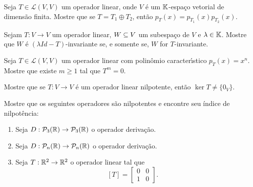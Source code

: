 \documentclass[12pt]{exam}
\begin{document}
\begin{exercicio}
Seja $T \in \mathcal{L}(V,V)$ um operador linear, onde $V$ \'e um $\mathbb{K}$-espa\c{c}o vetorial de dimens\~ao finita. Mostre que se $T = T_1 \oplus T_2$, ent\~ao $p_T(x) = p_{T_1}(x)p_{T_2}(x)$.
\end{exercicio}

\begin{exercicio}
  Sejam $T : V \to V$ um operador linear, $W \subseteq V$ um subespa\c{c}o de $V$ e $\lambda \in \mathbb{K}$. Mostre que $W$ \'e $(\lambda Id - T)$-invariante se, e somente se, $W$ for $T$-invariante.
\end{exercicio}

\begin{exercicio}
  Seja $T \in \mathcal{L}(V,V)$ um operador linear com polin\^omio caracter{\'\i}stico $p_T(x) = x^n$. Mostre que existe $m \ge 1$ tal que $T^m = 0$.
\end{exercicio}


\begin{exercicio}
  Mostre que se $T : V \to V$ \'e um operador linear nilpotente, ent\~ao $\ker T \ne \{0_V\}$.
\end{exercicio}

\begin{exercicio}
  Mostre que os seguintes operadores s\~ao nilpotentes e encontre seu \'indice de nilpot\^encia:
  \begin{enumerate}[label=({\alph*})]
    \item Seja $D : \mathcal{P}_3(\mathbb{R}) \to \mathcal{P}_3(\mathbb{R})$ o operador deriva\c{c}\~ao.
    \item Seja $D : \mathcal{P}_n(\mathbb{R}) \to \mathcal{P}_n(\mathbb{R})$ o operador deriva\c{c}\~ao.
    \item Seja $T : \mathbb{R}^2 \to \mathbb{R}^2$ o operador linear tal que
    \[
      [T] = \begin{bmatrix}
        0 & 0\\
        1 & 0
      \end{bmatrix}.
    \]
  \end{enumerate}
\end{exercicio}
\end{document}
